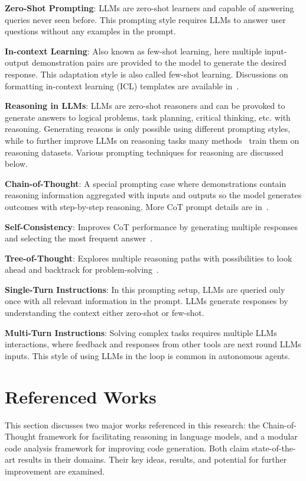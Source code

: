 \documentclass[a4paper,oneside]{book}
\begin{document}
\textbf{Zero-Shot Prompting}: LLMs are zero-shot learners and capable of answering queries never seen before. This prompting style requires LLMs to answer user questions without any examples in the prompt.

\textbf{In-context Learning}: Also known as few-shot learning, here multiple input-output demonstration pairs are provided to the model to generate the desired response. This adaptation style is also called few-shot learning. Discussions on formatting in-context learning (ICL) templates are available in~\cite{dong2022survey, zhao2023survey, wang2022super, chung2022scaling}.

\textbf{Reasoning in LLMs}: LLMs are zero-shot reasoners and can be provoked to generate answers to logical problems, task planning, critical thinking, etc. with reasoning. Generating reasons is only possible using different prompting styles, while to further improve LLMs on reasoning tasks many methods~\cite{chung2022scaling, iyer2022opt} train them on reasoning datasets. Various prompting techniques for reasoning are discussed below.

\textbf{Chain-of-Thought}: A special prompting case where demonstrations contain reasoning information aggregated with inputs and outputs so the model generates outcomes with step-by-step reasoning. More CoT prompt details are in~\cite{huang2022towards, wei2022chain, kim2023cot}.

\textbf{Self-Consistency}: Improves CoT performance by generating multiple responses and selecting the most frequent answer~\cite{wang2022self}.

\textbf{Tree-of-Thought}: Explores multiple reasoning paths with possibilities to look ahead and backtrack for problem-solving~\cite{yao2023tree}.

\textbf{Single-Turn Instructions}: In this prompting setup, LLMs are queried only once with all relevant information in the prompt. LLMs generate responses by understanding the context either zero-shot or few-shot.

\textbf{Multi-Turn Instructions}: Solving complex tasks requires multiple LLMs interactions, where feedback and responses from other tools are next round LLMs inputs. This style of using LLMs in the loop is common in autonomous agents.

\chapter{Referenced Works}
This section discusses two major works referenced in this research: the Chain-of-Thought framework for facilitating reasoning in language models, and a modular code analysis framework for improving code generation. Both claim state-of-the-art results in their domains. Their key ideas, results, and potential for further improvement are examined.
\end{document}
